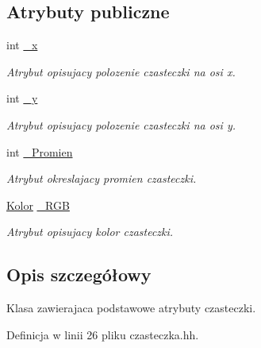 \subsection*{Atrybuty publiczne}
\begin{DoxyCompactItemize}
\item 
int \hyperlink{class_czasteczka_af809cd4fb1651ebf4b5980ee38c68e58}{\-\_\-x}
\begin{DoxyCompactList}\small\item\em Atrybut opisujacy polozenie czasteczki na osi x. \end{DoxyCompactList}\item 
int \hyperlink{class_czasteczka_a285d25465eee101b6af073809e2fee00}{\-\_\-y}
\begin{DoxyCompactList}\small\item\em Atrybut opisujacy polozenie czasteczki na osi y. \end{DoxyCompactList}\item 
int \hyperlink{class_czasteczka_a5a1d126d89bd571c79a5691c45e2f469}{\-\_\-\-Promien}
\begin{DoxyCompactList}\small\item\em Atrybut okreslajacy promien czasteczki. \end{DoxyCompactList}\item 
\hyperlink{class_kolor}{Kolor} \hyperlink{class_czasteczka_ab9c93cfb3cf0360579ad0def2a94178c}{\-\_\-\-R\-G\-B}
\begin{DoxyCompactList}\small\item\em Atrybut opisujacy kolor czasteczki. \end{DoxyCompactList}\end{DoxyCompactItemize}


\subsection{Opis szczegółowy}
Klasa zawierajaca podstawowe atrybuty czasteczki. 

Definicja w linii 26 pliku czasteczka.\-hh.



